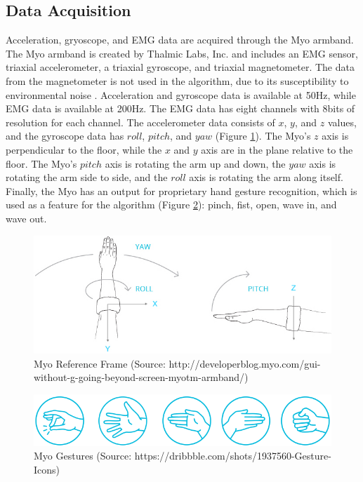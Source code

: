 \subsection{Data Acquisition}
Acceleration, gryoscope, and EMG data are acquired through the Myo armband. The Myo armband is created by Thalmic Labs, Inc. and includes an EMG sensor, triaxial accelerometer, a triaxial gyroscope, and triaxial magnetometer. The data from the magnetometer is not used in the algorithm, due to its susceptibility to environmental noise \cite{Ahmad2013}. Acceleration and gyroscope data is available at 50Hz, while EMG data is available at 200Hz. The EMG data has eight channels with 8bits of resolution for each channel. The accelerometer data consists of $x$, $y$, and $z$ values, and the gyroscope data has $roll$, $pitch$, and $yaw$ (Figure \ref{fig:myo}). The Myo's $z$ axis is perpendicular to the floor, while the $x$ and $y$ axis are in the plane relative to the floor. The Myo's $pitch$ axis is rotating the arm up and down, the $yaw$ axis is rotating the arm side to side, and the $roll$ axis is rotating the arm along itself. Finally, the Myo has an output for proprietary hand gesture recognition, which is used as a feature for the algorithm (Figure \ref{fig:myogestures}): pinch, fist, open, wave in, and wave out.

\begin{figure}
	\centering
	\includegraphics[width=0.7\linewidth]{pictures/myo}
	\caption{Myo Reference Frame (Source: http://developerblog.myo.com/gui-without-g-going-beyond-screen-myotm-armband/)}
	\label{fig:myo}
\end{figure}

\begin{figure}
	\centering
	\includegraphics[width=0.7\linewidth]{pictures/myogestures}
	\caption{Myo Gestures (Source: https://dribbble.com/shots/1937560-Gesture-Icons)}
	\label{fig:myogestures}
\end{figure}

